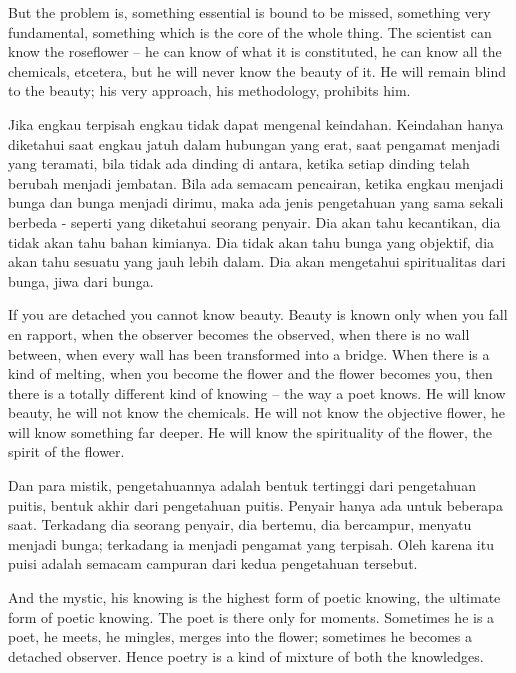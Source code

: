 \english
But the problem is, something essential is bound to be missed, something very
fundamental, something which is the core of the whole thing. The scientist can know the roseflower -- he can know of what it is constituted, he can know all the chemicals, etcetera, but he will never know the beauty of it. He will remain blind to the beauty; his very approach, his methodology, prohibits him.

\bahasa
Jika engkau terpisah engkau tidak dapat mengenal keindahan. Keindahan hanya diketahui saat engkau jatuh dalam hubungan yang erat, saat pengamat menjadi yang teramati, bila tidak ada dinding di antara, ketika setiap dinding telah berubah menjadi jembatan. Bila ada semacam pencairan, ketika engkau menjadi bunga dan bunga menjadi dirimu, maka ada jenis pengetahuan yang sama sekali berbeda - seperti yang diketahui seorang penyair. Dia akan tahu kecantikan, dia tidak akan tahu bahan kimianya. Dia tidak akan tahu bunga yang objektif, dia akan tahu sesuatu yang jauh lebih dalam. Dia akan mengetahui spiritualitas dari bunga, jiwa dari bunga.

\english
If you are detached you cannot know beauty. Beauty is known only when you fall en rapport, when the observer becomes the observed, when there is no wall between, when every wall has been transformed into a bridge. When there is a kind of melting, when you become the flower and the flower becomes you, then there is a totally different kind of knowing -- the way a poet knows. He will know beauty, he will not know the chemicals. He will not know the objective flower, he will know something far deeper. He will know the spirituality of the flower, the spirit of the flower.

\bahasa
Dan para mistik, pengetahuannya adalah bentuk tertinggi dari pengetahuan puitis, bentuk akhir dari pengetahuan puitis. Penyair hanya ada untuk beberapa saat. Terkadang dia seorang penyair, dia bertemu, dia bercampur, menyatu menjadi bunga; terkadang ia menjadi pengamat yang terpisah. Oleh karena itu puisi adalah semacam campuran dari kedua pengetahuan tersebut.

\english
And the mystic, his knowing is the highest form of poetic knowing, the ultimate form of poetic knowing. The poet is there only for moments. Sometimes he is a poet, he meets, he mingles, merges into the flower; sometimes he becomes a detached observer. Hence poetry is a kind of mixture of both the knowledges.

\bahasa
